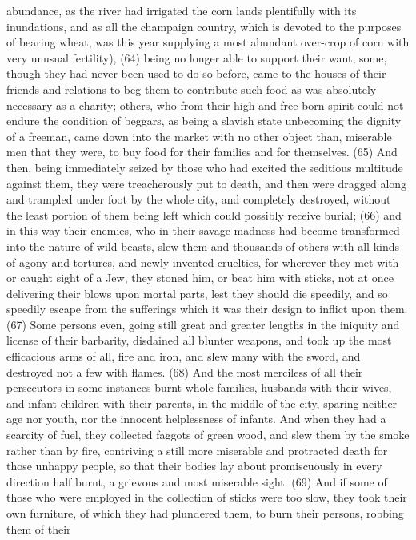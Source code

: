 abundance, as the river had irrigated the corn lands plentifully with its inundations, and as all the
champaign country, which is devoted to the purposes of bearing wheat, was this year supplying a
most abundant over-crop of corn with very unusual fertility), (64) being no longer able to support
their want, some, though they had never been used to do so before, came to the houses of their
friends and relations to beg them to contribute such food as was absolutely necessary as a
charity; others, who from their high and free-born spirit could not endure the condition of beggars,
as being a slavish state unbecoming the dignity of a freeman, came down into the market with no
other object than, miserable men that they were, to buy food for their families and for themselves.
(65) And then, being immediately seized by those who had excited the seditious multitude against
them, they were treacherously put to death, and then were dragged along and trampled under foot
by the whole city, and completely destroyed, without the least portion of them being left which could
possibly receive burial; (66) and in this way their enemies, who in their savage madness had
become transformed into the nature of wild beasts, slew them and thousands of others with all
kinds of agony and tortures, and newly invented cruelties, for wherever they met with or caught
sight of a Jew, they stoned him, or beat him with sticks, not at once delivering their blows upon
mortal parts, lest they should die speedily, and so speedily escape from the sufferings which it was
their design to inflict upon them. (67) Some persons even, going still great and greater lengths in
the iniquity and license of their barbarity, disdained all blunter weapons, and took up the most
efficacious arms of all, fire and iron, and slew many with the sword, and destroyed not a few with
flames. (68) And the most merciless of all their persecutors in some instances burnt whole
families, husbands with their wives, and infant children with their parents, in the middle of the city,
sparing neither age nor youth, nor the innocent helplessness of infants. And when they had a
scarcity of fuel, they collected faggots of green wood, and slew them by the smoke rather than by
fire, contriving a still more miserable and protracted death for those unhappy people, so that their
bodies lay about promiscuously in every direction half burnt, a grievous and most miserable sight.
(69) And if some of those who were employed in the collection of sticks were too slow, they took
their own furniture, of which they had plundered them, to burn their persons, robbing them of their
